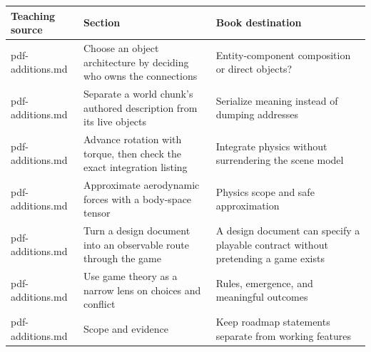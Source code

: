 {\def\LTcaptype{none} %
\begin{longtable}[]{@{}
  >{\raggedright\arraybackslash}p{}
  >{\raggedright\arraybackslash}p{}
  >{\raggedright\arraybackslash}p{}@{}}
\toprule\noalign{}
\begin{minipage}[b]{\linewidth}\raggedright
Teaching source
\end{minipage} & \begin{minipage}[b]{\linewidth}\raggedright
Section
\end{minipage} & \begin{minipage}[b]{\linewidth}\raggedright
Book destination
\end{minipage} \\
\midrule\noalign{}
\endhead
\bottomrule\noalign{}
\endlastfoot
pdf-additions.md & Choose an object architecture by deciding who owns the connections & Entity-component composition or direct objects? \\
pdf-additions.md & Separate a world chunk's authored description from its live objects & Serialize meaning instead of dumping addresses \\
pdf-additions.md & Advance rotation with torque, then check the exact integration listing & Integrate physics without surrendering the scene model \\
pdf-additions.md & Approximate aerodynamic forces with a body-space tensor & Physics scope and safe approximation \\
pdf-additions.md & Turn a design document into an observable route through the game & A design document can specify a playable contract without pretending a game exists \\
pdf-additions.md & Use game theory as a narrow lens on choices and conflict & Rules, emergence, and meaningful outcomes \\
pdf-additions.md & Scope and evidence & Keep roadmap statements separate from working features \\
\end{longtable}
}

